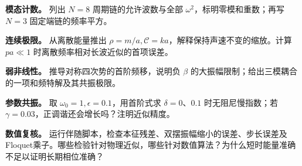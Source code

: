 \begin{bookexercises}
\item {} \textbf{模态计数。} 列出 $N=8$ 周期链的允许波数与全部 $\omega^2$，标明零模和重数；再写 $N=3$ 固定端链的频率平方。
\item {} \textbf{连续极限。} 从离散能量推出 $\rho=m/a,\mathcal C=ka$，解释保持声速不变的缩放。计算 $pa\ll1$ 时离散频率相对长波近似的首项误差。
\item {} \textbf{弱非线性。} 推导对称四次势的首阶频移，说明负 $\beta$ 的大振幅限制；给出三模耦合的一项和频特解及其共振极限。
\item {} \textbf{参数共振。} 取 $\omega_0=1,\epsilon=0.1$，用首阶式求 $\delta=0$、$0.1$ 时无阻尼慢指数；若 $\gamma=0.03$，正调谐还会增长吗？注明近似精度。
\item {} \textbf{数值复核。} 运行伴随脚本，检查本征残差、双摆振幅缩小的误差、步长误差及Floquet乘子。哪些检验针对物理近似，哪些针对数值算法？为什么短时能量准确不足以证明长期相位准确？
\end{bookexercises}

